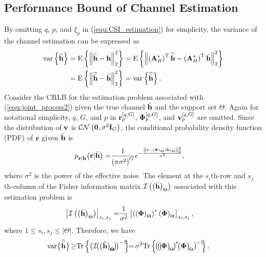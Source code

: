 \documentclass[final]{IEEEtran}
\begin{document}
\subsection{Performance Bound of Channel Estimation}\label{S4.5}

 By omitting $q$, $p$, and $\xi_p$ in (\ref{equ:CSI_estimation}) for simplicity, the
 variance of the channel estimation can be expressed as
\begin{align}\label{eq23} %
 {\rm var}\left\{\widehat{\bf h}\right\} & = {\rm E}\left\{\left\|\widehat{\bf h} - {\bf h}\right\|_2^2
 \right\} = {\rm E}\left\{\left\|\left( {\bf A}_B^{*} \right)^{\rm T} \widehat{\bar{\bf h}} -
 \left( {\bf A}_B^{*} \right)^{\rm T} \bar{\bf h} \right\|_2^2 \right\}  \nonumber \\ &
 = {\rm E}\left\{\left\|\widehat{\bar{\bf h}} - \bar{\bf h} \right\|_2^2 \right\}
 = {\rm{var}}\left\{ \widehat{\bar{\bf h}}\right\} .
\end{align}
 Consider the CRLB for the estimation problem associated with (\ref{equ:joint_process2})
 given the true channel $\bar{\bf h}$ and the support set $\Theta$. Again for notational
 simplicity,  $q$, $G$, and $p$ in  ${\bf r}_p^{[q,G]}$, ${\bf{\Phi}}_p^{[q,G]}$, and
 ${\bf v}_p^{[q,G]}$ are omitted. Since the distribution of ${\bf v}$ is
 ${\cal CN}\left( {\bf 0},\sigma^2{\bf I}_G \right)$, the conditional probability density
 function (PDF) of ${\bf r}$ given $\bar{\bf h}$ is
\begin{align}\label{equ:pdf} %
 p_{{\bf r} | \bar{\bf h}} \big( {\bf r} | \bar{\bf h} \big) =& \frac{1}{\left( \pi \sigma^2 \right)^{G}}
 e^{ - \frac{\left\| {\bf r} - ( {\bf{\Phi}} )_{\Theta}
 ( \bar{\bf h} )_{\Theta} \right\|_2^2}{\sigma^2} } ,
\end{align}
 where $\sigma^2$ is the power of the effective noise. The element at the $s_i$th-row and
 $s_j$th-column of the Fisher information matrix ${\cal I}\left( \big(\bar{\bf h}\big)_{\Theta}
 \right)$ associated with this estimation problem is
\begin{align}\label{equ:fisher} %
 \left[ {\cal{ {I}}} \left( \big(\bar{\bf h}\big)_{\Theta} \right) \right]_{s_i,s_j}
 =& \frac{1}{\sigma^2}\left[ \left(\left( {\bf{\Phi}} \right)_{\Theta} \right)^{*} \left(
 {\bf{\Phi}}\right)_{\Theta} \right]_{s_i,s_j},%
\end{align}
 where $1 \le s_i,s_j \le |\Theta|$. Therefore, we have
\begin{align}\label{equ:CRLB} %
\!\! {\rm var}\big\{ \widehat{\bar{\bf h}} \big\}\! \ge & {\rm Tr}\left\{{\big( \bf{\cal{I}}
\! \big( \big(\bar{\bf h}\big)_{\!\Theta}\! \big)\! \big)}^{-1}\!\! \right\} \!\!  = \!
 \sigma^2 {\rm Tr}\left\{\!\big(\! \big(\! \big( \!{\bf{\Phi}} \big)_{\!\Theta}\! \big)^{\!*} \! \big(
 {\bf{\Phi}} \big)_{\!\Theta} \big)^{\!-1\!} \! \right\}.%
\end{align}
\end{document}
